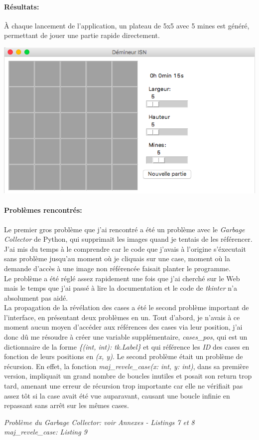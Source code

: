 \documentclass[12pt, a4paper]{article}
\newcommand{\annexe}[1]{
    \begin{flushright}
    \small{\emph{#1}}
    \end{flushright}
}
\begin{document}
\paragraph{Résultats:}
À chaque lancement de l'application, un plateau de 5x5 avec 5 mines est généré,
permettant de jouer une partie rapide directement. \\

\centerline{\includegraphics[scale=0.4]{interface_exemple.png}}

\paragraph{Problèmes rencontrés:}
Le premier gros problème que j'ai rencontré a été un problème avec le
\emph{Garbage Collector} de Python, qui supprimait les images quand je tentais
de les référencer. J'ai mis du temps à le comprendre car le code que j'avais
à l'origine s'éxecutait sans problème jusqu'au moment où je cliquais sur une
case, moment où la demande d'accès à une image non référencée faisait planter
le programme. \\
Le problème a été réglé assez rapidement une fois que j'ai cherché sur le Web
mais le temps que j'ai passé à lire la documentation et le code de
\emph{tkinter} n'a absolument pas aidé. \\
La propagation de la révélation des cases a été le second problème important de
l'interface, en présentant deux problèmes en un. Tout d'abord, je n'avais à ce
moment aucun moyen d'accéder aux références des cases via leur position, j'ai
donc dû me résoudre à créer une variable supplémentaire, \emph{cases\_pos}, qui
est un dictionnaire de la forme \emph{\{(int, int): tk.Label\}} et qui
référence les \emph{ID} des cases en fonction de leurs positions en
\emph{(x, y)}. Le second problème était un problème de récursion. En effet,
la fonction \emph{maj\_revele\_case(x: int, y: int)}, dans sa première version,
impliquait un grand nombre de boucles inutiles et posait son return trop tard,
amenant une erreur de récursion trop importante car elle ne vérifiait pas assez
tôt si la case avait été vue auparavant, causant une boucle infinie en
repassant sans arrêt sur les mêmes cases.
\annexe{Problème du Garbage Collector: voir Annexes - Listings 7 et 8 \\
maj\_revele\_case: Listing 9}
\end{document}
